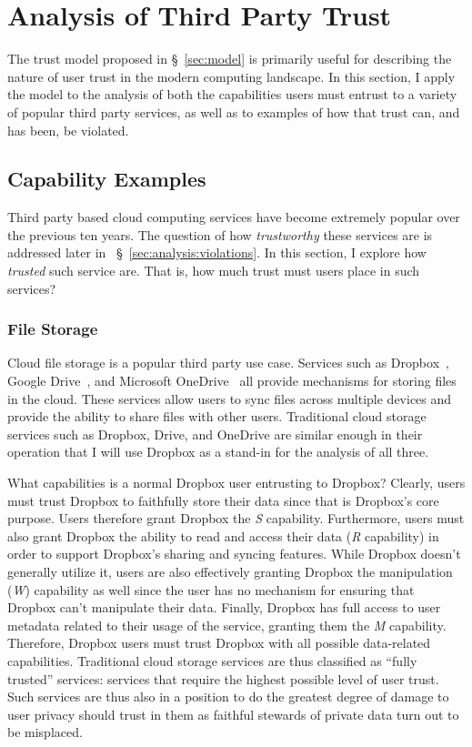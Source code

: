 \section{Analysis of Third Party Trust}
\label{sec:analysis}

The trust model proposed in \S~\ref{sec:model} is primarily useful for
describing the nature of user trust in the modern computing
landscape. In this section, I apply the model to the analysis of both
the capabilities users must entrust to a variety of popular third
party services, as well as to examples of how that trust can, and has
been, be violated.

\subsection{Capability Examples}
\label{sec:analysis:capabilities}

Third party based cloud computing services have become extremely
popular over the previous ten years.  The question of how
\textit{trustworthy} these services are is addressed later in
~\S~\ref{sec:analysis:violations}. In this section, I explore how
\textit{trusted} such service are. That is, how much trust must users
place in such services?

\subsubsection{File Storage}

Cloud file storage is a popular third party use case. Services such as
Dropbox~\cite{dropbox}, Google Drive~\cite{google-drive}, and
Microsoft OneDrive~\cite{microsoft-onedrive} all provide mechanisms
for storing files in the cloud. These services allow users to sync
files across multiple devices and provide the ability to share files
with other users. Traditional cloud storage services such as Dropbox,
Drive, and OneDrive are similar enough in their operation that I will
use Dropbox as a stand-in for the analysis of all three.

What capabilities is a normal Dropbox user entrusting to Dropbox?
Clearly, users must trust Dropbox to faithfully store their data since
that is Dropbox's core purpose. Users therefore grant Dropbox the
\emph{S} capability. Furthermore, users must also grant Dropbox the
ability to read and access their data (\emph{R} capability) in order
to support Dropbox's sharing and syncing features. While Dropbox
doesn't generally utilize it, users are also effectively granting
Dropbox the manipulation (\emph{W}) capability as well since the user
has no mechanism for ensuring that Dropbox can't manipulate their
data. Finally, Dropbox has full access to user metadata related to
their usage of the service, granting them the \emph{M}
capability. Therefore, Dropbox users must trust Dropbox with all
possible data-related capabilities. Traditional cloud storage services
are thus classified as ``fully trusted'' services: services that
require the highest possible level of user trust. Such services are
thus also in a position to do the greatest degree of damage to user
privacy should trust in them as faithful stewards of private data turn
out to be misplaced.

